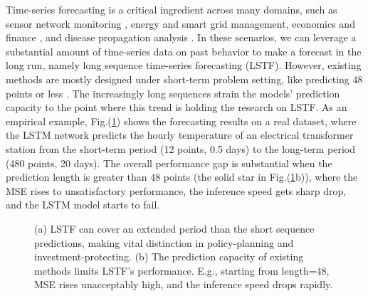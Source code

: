 \noindent Time-series forecasting is a critical ingredient across many domains, such as sensor network monitoring \cite{papadimitriou2006optimal}, energy and smart grid management, economics and finance \cite{DBLP:conf/vldb/ZhuS02}, and disease propagation analysis \cite{DBLP:conf/kdd/MatsubaraSPF14}. In these scenarios, we can leverage a substantial amount of time-series data on past behavior to make a forecast in the long run, namely long sequence time-series forecasting (LSTF).
However, existing methods are mostly designed under short-term problem setting, like predicting 48 points or less \cite{hochreiter1997long, li2017graph, yu2017long, journals/corr/abs-1904-07464, conf/ijcai/QinSCCJC17,wen2017multi}. 
The increasingly long sequences strain the models' prediction capacity to the point where this trend is holding the research on LSTF.
As an empirical example, Fig.(\ref{fig:intro.4fig}) shows the forecasting results on a real dataset, where the LSTM network predicts the hourly temperature of an electrical transformer station from the short-term period (12 points, 0.5 days) to the long-term period (480 points, 20 days). The overall performance gap is substantial when the prediction length is greater than 48 points (the solid star in Fig.(\ref{fig:intro.4fig}b)), where the MSE rises to unsatisfactory performance, the inference speed gets sharp drop, and the LSTM model starts to fail.

\begin{figure}[t]
\centering
{}
\hfill
{}
\caption{(a) LSTF can cover an extended period than the short sequence predictions, making vital distinction in policy-planning and investment-protecting. (b) The prediction capacity of existing methods limits LSTF's performance. E.g., starting from length=48, MSE rises unacceptably high, and the inference speed drops rapidly.}
\label{fig:intro.4fig}
\end{figure}


